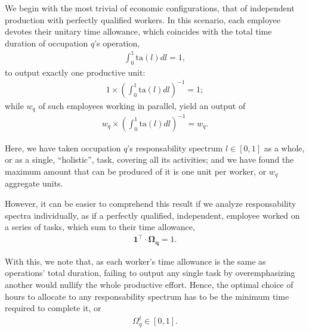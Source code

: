 \documentclass[hidelinks, nonatbib]{elsarticle}
\begin{document}
We begin with the most trivial of economic configurations, that of independent production with perfectly qualified workers. In this scenario, each employee devotes their unitary time allowance, which coincides with the total time duration of occupation $q$'s operation,
\begin{gather}
    \int_{0}^{1}{
        \text{ta}(l)
        dl
    }
    =
    1
    ,
\end{gather}
to output exactly one productive unit:
\begin{gather}
    1
    \times
    \left(
        \int_{0}^{1}{
            \text{ta}(l)dl
        }
    \right) ^ {-1}
    =
    1
    ;
\end{gather}
while $w_q$ of such employees working in parallel, yield an output of
\begin{align}
    w_q 
    \times 
    \left(
        \int_{0}^{1}{
            \text{ta}(l)dl
        }
    \right) ^ {-1}
    =
    w_q
    .
\end{align}

Here, we have taken occupation $q$'s responsability spectrum $l \in [0,1]$ as a whole, or as a single, ``holistic'', task, covering all its activities; and we have found the maximum amount that can be produced of it is one unit per worker, or $w_q$ aggregate units.

However, it can be easier to comprehend this result if we analyze responsability spectra individually, as if a perfectly qualified, independent, employee worked on a series of tasks, which sum to their time allowance,
\begin{gather}
    \boldsymbol{1} ^ {\top}
    \cdot
    \boldsymbol{\Omega_{q}}
    = 
    1
    .
\end{gather}

With this, we note that, as each worker's time allowance is the same as operations' total duration, failing to output any single task by overemphasizing another would nullify the whole productive effort. Hence, the optimal choice of hours to allocate to any responsability spectrum has to be the minimum time required to complete it, or
\begin{gather}
    \Omega_{q}^{\ell} 
    \in
    [0,1]
    .
\end{gather}
\end{document}
